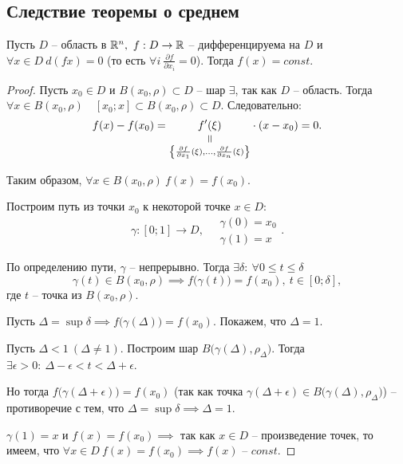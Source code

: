 \subsection{Следствие теоремы о среднем}

\begin{corollary}
    Пусть $ D $ -- область в $ \mathbb{R}^n, \ f:D \rightarrow \mathbb{R} $ -- дифференцируема на $ D $ и $ \forall x \in D \ d(fx) = 0 $ (то есть $ \forall i \ \frac{\partial f}{\partial x_i} = 0 $). Тогда $ f(x) = const $.
\end{corollary}

\begin{proof}
    Пусть $ x_0 \in D $ и $ B(x_0,\rho)\subset D $ -- шар $ \exists $, так как $ D $ -- область. Тогда $ \forall x \in B(x_0,\rho) \quad [x_0;x]\subset B(x_0,\rho)\subset D $. Следовательно:
    \[
        f(x) - f(x_0) = \equalto{f'(\xi)}{\left\{\frac{\partial f}{\partial x_1}(\xi),\ldots,\frac{\partial f}{\partial x_n}(\xi)\right\}}\cdot (x-x_0) = 0.
    \]

    Таким образом, $ \forall x \in B(x_0,\rho) \ f(x) = f(x_0) $.

    Построим путь из точки $ x_0 $ к некоторой точке $ x \in D $:
    \[
        \gamma:[0;1]\rightarrow D, \quad \begin{array}{l}
            \gamma(0) = x_0 \\
            \gamma(1) = x
        \end{array}.
    \]

    По определению пути, $ \gamma $ -- непрерывно. Тогда $ \exists\delta: \ \forall 0 \leqslant t \leqslant\delta$
    \[
        \gamma(t) \in B(x_0,\rho) \implies f\big(\gamma(t)\big) = f(x_0), \ t \in [0;\delta],
    \] где $ t $ -- точка из $ B(x_0,\rho) $.

    Пусть $ \Delta = \sup\delta \implies f\big(\gamma(\Delta)\big) = f(x_0) $. Покажем, что $\Delta = 1$.

    Пусть $ \Delta < 1 \ (\Delta \ne 1) $. Построим шар $ B\big(\gamma(\Delta),\rho_\Delta\big) $. Тогда $ \exists \epsilon > 0: \ \Delta - \epsilon < t < \Delta + \epsilon $.

    Но тогда $ f\big(\gamma(\Delta + \epsilon)\big) = f(x_0) $ (так как точка $ \gamma(\Delta + \epsilon) \in B\big(\gamma(\Delta),\rho_\Delta\big) $) -- противоречие с тем, что $ \Delta = \sup\delta \implies \Delta = 1 $.

    $ \gamma(1) = x $ и $ f(x) = f(x_0) \implies $ так как $ x \in D $ -- произведение точек, то имеем, что $ \forall x \in D \ f(x) = f(x_0) \implies f(x)\text{ -- }const $.
\end{proof}

